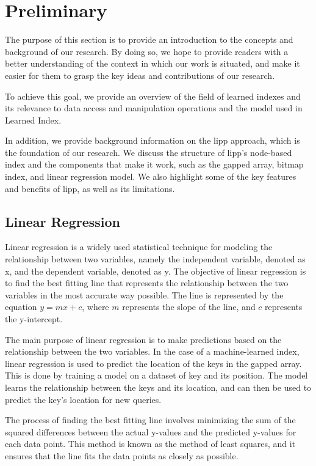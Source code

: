 \chapter{Preliminary}
The purpose of this section is to provide an introduction to the concepts and background of our research. By doing so, we hope to provide readers with a better understanding of the context in which our work is situated, and make it easier for them to grasp the key ideas and contributions of our research.

To achieve this goal, we provide an overview of the field of learned indexes and its relevance to data access and manipulation operations and the model used in Learned Index.

In addition, we provide background information on the \acrshort{lipp} approach, which is the foundation of our research. We discuss the structure of \acrshort{lipp}'s node-based index and the components that make it work, such as the gapped array, bitmap index, and linear regression model. We also highlight some of the key features and benefits of \acrshort{lipp}, as well as its limitations.

\section{Linear Regression}
Linear regression is a widely used statistical technique for modeling the relationship between two variables, namely the independent variable, denoted as x, and the dependent variable, denoted as y. The objective of linear regression is to find the best fitting line that represents the relationship between the two variables in the most accurate way possible. The line is represented by the equation $y = mx + c$, where $m$ represents the slope of the line, and $c$ represents the y-intercept.

The main purpose of linear regression is to make predictions based on the relationship between the two variables. In the case of a machine-learned index, linear regression is used to predict the location of the keys in the gapped array. This is done by training a model on a dataset of key and its position. The model learns the relationship between the keys and its location, and can then be used to predict the key's location for new queries.

The process of finding the best fitting line involves minimizing the sum of the squared differences between the actual y-values and the predicted y-values for each data point. This method is known as the method of least squares, and it ensures that the line fits the data points as closely as possible.


